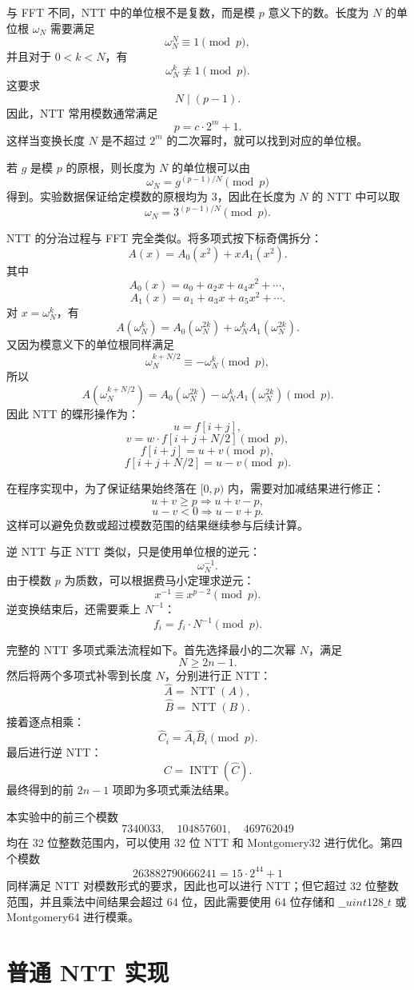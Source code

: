 \documentclass[a4paper]{article}
\begin{document}
与 FFT 不同，NTT 中的单位根不是复数，而是模 \(p\) 意义下的数。长度为 \(N\) 的单位根 \(\omega_N\) 需要满足
\[
\omega_N^N\equiv 1\pmod p,
\]
并且对于 \(0<k<N\)，有
\[
\omega_N^k\not\equiv 1\pmod p.
\]
这要求
\[
N\mid (p-1).
\]
因此，NTT 常用模数通常满足
\[
p=c\cdot 2^m+1.
\]
这样当变换长度 \(N\) 是不超过 \(2^m\) 的二次幂时，就可以找到对应的单位根。

若 \(g\) 是模 \(p\) 的原根，则长度为 \(N\) 的单位根可以由
\[
\omega_N=g^{(p-1)/N}\pmod p
\]
得到。实验数据保证给定模数的原根均为 \(3\)，因此在长度为 \(N\) 的 NTT 中可以取
\[
\omega_N=3^{(p-1)/N}\pmod p.
\]

NTT 的分治过程与 FFT 完全类似。将多项式按下标奇偶拆分：
\[
A(x)=A_0(x^2)+xA_1(x^2).
\]
其中
\[
A_0(x)=a_0+a_2x+a_4x^2+\cdots,
\]
\[
A_1(x)=a_1+a_3x+a_5x^2+\cdots.
\]
对 \(x=\omega_N^k\)，有
\[
A(\omega_N^k)
=
A_0(\omega_N^{2k})+\omega_N^kA_1(\omega_N^{2k}).
\]
又因为模意义下的单位根同样满足
\[
\omega_N^{k+N/2}\equiv -\omega_N^k\pmod p,
\]
所以
\[
A(\omega_N^{k+N/2})
=
A_0(\omega_N^{2k})-\omega_N^kA_1(\omega_N^{2k})\pmod p.
\]
因此 NTT 的蝶形操作为：
\[
u=f[i+j],
\]
\[
v=w\cdot f[i+j+N/2]\pmod p,
\]
\[
f[i+j]=u+v\pmod p,
\]
\[
f[i+j+N/2]=u-v\pmod p.
\]

在程序实现中，为了保证结果始终落在 \([0,p)\) 内，需要对加减结果进行修正：
\[
u+v\ge p \Rightarrow u+v-p,
\]
\[
u-v<0 \Rightarrow u-v+p.
\]
这样可以避免负数或超过模数范围的结果继续参与后续计算。

逆 NTT 与正 NTT 类似，只是使用单位根的逆元：
\[
\omega_N^{-1}.
\]
由于模数 \(p\) 为质数，可以根据费马小定理求逆元：
\[
x^{-1}\equiv x^{p-2}\pmod p.
\]
逆变换结束后，还需要乘上 \(N^{-1}\)：
\[
f_i=f_i\cdot N^{-1}\pmod p.
\]

完整的 NTT 多项式乘法流程如下。首先选择最小的二次幂 \(N\)，满足
\[
N\ge 2n-1.
\]
然后将两个多项式补零到长度 \(N\)，分别进行正 NTT：
\[
\hat{A}=\operatorname{NTT}(A),
\]
\[
\hat{B}=\operatorname{NTT}(B).
\]
接着逐点相乘：
\[
\hat{C}_i=\hat{A}_i\hat{B}_i\pmod p.
\]
最后进行逆 NTT：
\[
C=\operatorname{INTT}(\hat{C}).
\]
最终得到的前 \(2n-1\) 项即为多项式乘法结果。

本实验中的前三个模数
\[
7340033,\quad 104857601,\quad 469762049
\]
均在 32 位整数范围内，可以使用 32 位 NTT 和 Montgomery32 进行优化。第四个模数
\[
263882790666241=15\cdot 2^{44}+1
\]
同样满足 NTT 对模数形式的要求，因此也可以进行 NTT；但它超过 32 位整数范围，并且乘法中间结果会超过 64 位，因此需要使用 64 位存储和 \(\_\_uint128\_t\) 或 Montgomery64 进行模乘。


\section{普通 NTT 实现}
\end{document}
